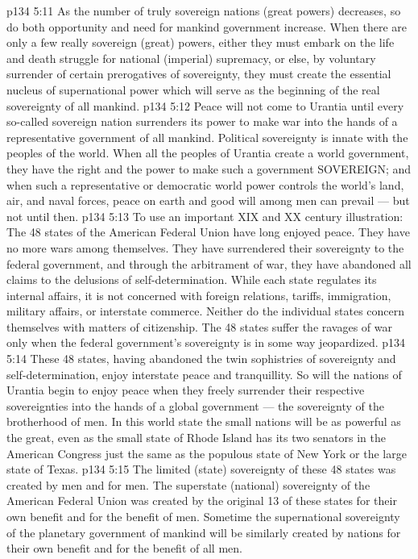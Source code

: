 \vs p134 5:11 As the number of truly sovereign nations (great powers) decreases, so do both opportunity and need for mankind government increase. When there are only a few really sovereign (great) powers, either they must embark on the life and death struggle for national (imperial) supremacy, or else, by voluntary surrender of certain prerogatives of sovereignty, they must create the essential nucleus of supernational power which will serve as the beginning of the real sovereignty of all mankind.
\vs p134 5:12 \pc Peace will not come to Urantia until every so\hyp{}called sovereign nation surrenders its power to make war into the hands of a representative government of all mankind. Political sovereignty is innate with the peoples of the world. When all the peoples of Urantia create a world government, they have the right and the power to make such a government SOVEREIGN; and when such a representative or democratic world power controls the world’s land, air, and naval forces, peace on earth and good will among men can prevail --- but not until then.
\vs p134 5:13 To use an important XIX and XX century illustration: The 48 states of the American Federal Union have long enjoyed peace. They have no more wars among themselves. They have surrendered their sovereignty to the federal government, and through the arbitrament of war, they have abandoned all claims to the delusions of self\hyp{}determination. While each state regulates its internal affairs, it is not concerned with foreign relations, tariffs, immigration, military affairs, or interstate commerce. Neither do the individual states concern themselves with matters of citizenship. The 48 states suffer the ravages of war only when the federal government’s sovereignty is in some way jeopardized.
\vs p134 5:14 \pc These 48 states, having abandoned the twin sophistries of sovereignty and self\hyp{}determination, enjoy interstate peace and tranquillity. So will the nations of Urantia begin to enjoy peace when they freely surrender their respective sovereignties into the hands of a global government --- the sovereignty of the brotherhood of men. In this world state the small nations will be as powerful as the great, even as the small state of Rhode Island has its two senators in the American Congress just the same as the populous state of New York or the large state of Texas.
\vs p134 5:15 The limited (state) sovereignty of these 48 states was created by men and for men. The superstate (national) sovereignty of the American Federal Union was created by the original 13 of these states for their own benefit and for the benefit of men. Sometime the supernational sovereignty of the planetary government of mankind will be similarly created by nations for their own benefit and for the benefit of all men.
